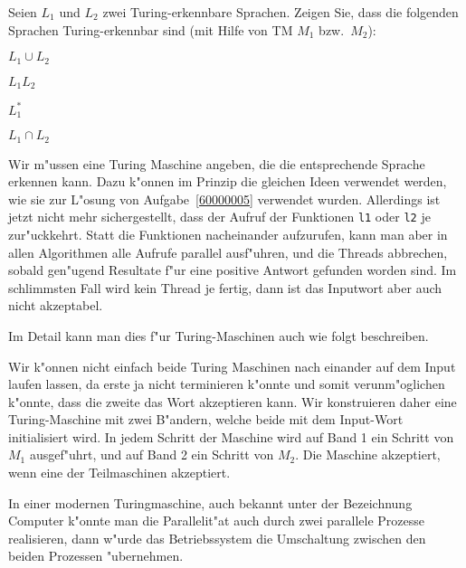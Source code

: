 Seien $L_1$ und $L_2$ zwei Turing-erkennbare Sprachen. Zeigen Sie, dass
die folgenden Sprachen Turing-erkennbar sind (mit Hilfe von TM $M_1$
bzw.~$M_2$):
\begin{teilaufgaben}
\item $L_1\cup L_2$
\item $L_1L_2$
\item $L_1^*$
\item $L_1\cap L_2$
\end{teilaufgaben}

\begin{loesung}
Wir m"ussen eine Turing Maschine angeben, die die entsprechende
Sprache erkennen kann.
Dazu k"onnen im Prinzip die gleichen Ideen verwendet werden, wie sie
zur L"osung von Aufgabe~\ref{60000005} verwendet wurden.
Allerdings ist jetzt nicht mehr sichergestellt, dass der Aufruf
der Funktionen \texttt{l1} oder \texttt{l2} je zur"uckkehrt.
Statt die Funktionen nacheinander aufzurufen, kann man aber in allen
Algorithmen alle Aufrufe parallel ausf"uhren, und die Threads abbrechen,
sobald gen"ugend Resultate f"ur eine positive Antwort gefunden worden
sind. Im schlimmsten Fall wird kein Thread je fertig, dann ist das
Inputwort aber auch nicht akzeptabel.

Im Detail kann man dies f"ur Turing-Maschinen auch wie folgt
beschreiben.
\begin{teilaufgaben}
\item Wir k"onnen nicht einfach beide Turing Maschinen nach einander
auf dem Input laufen lassen, da erste ja nicht terminieren k"onnte und
somit verunm"oglichen k"onnte, dass die zweite das Wort akzeptieren kann.
Wir konstruieren daher eine Turing-Maschine mit zwei B"andern, welche
beide mit dem Input-Wort initialisiert wird. In jedem Schritt der
Maschine wird auf Band 1 ein Schritt von $M_1$ ausgef"uhrt,
und auf Band 2 ein Schritt von $M_2$.
Die Maschine akzeptiert, wenn eine der Teilmaschinen
akzeptiert.

In einer modernen Turingmaschine, auch bekannt unter der Bezeichnung
Computer k"onnte man die Parallelit"at auch durch zwei parallele
Prozesse realisieren, dann w"urde das Betriebssystem die Umschaltung
zwischen den beiden Prozessen "ubernehmen.


\end{teilaufgaben}
\end{loesung}
